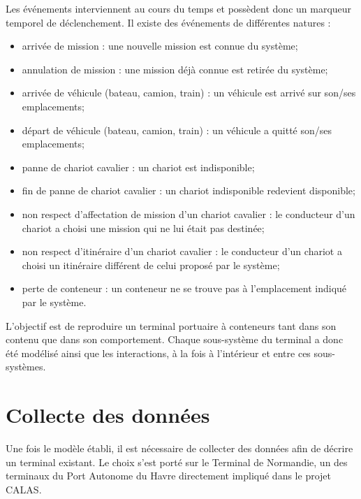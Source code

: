 Les événements interviennent au cours du temps et possèdent donc un marqueur temporel de déclenchement. Il existe des événements de différentes natures :
\begin{itemize}
 \item arrivée de mission : une nouvelle mission est connue du système;
 \item annulation de mission : une mission déjà connue est retirée du système;
 \item arrivée de véhicule (bateau, camion, train) : un véhicule est arrivé sur son/ses emplacements;
 \item départ de véhicule (bateau, camion, train) : un véhicule a quitté son/ses emplacements;
 \item panne de chariot cavalier : un chariot est indisponible;
 \item fin de panne de chariot cavalier : un chariot indisponible redevient disponible;
 \item non respect d'affectation de mission d'un chariot cavalier : le conducteur d'un chariot a choisi une mission qui ne lui était pas destinée;
 \item non respect d'itinéraire d'un chariot cavalier : le conducteur d'un chariot a choisi un itinéraire différent de celui proposé par le système;
 \item perte de conteneur : un conteneur ne se trouve pas à l'emplacement indiqué par le système.
\end{itemize}

L'objectif est de reproduire un terminal portuaire à conteneurs tant dans son contenu que dans son comportement. Chaque sous-système du terminal a donc été modélisé ainsi que les interactions, à la fois à l'intérieur et entre ces sous-systèmes.
 
\section{Collecte des données}

Une fois le modèle établi, il est nécessaire de collecter des données afin de décrire un terminal existant. Le choix s'est porté sur le Terminal de Normandie, un des terminaux du Port Autonome du Havre directement impliqué dans le projet CALAS.

